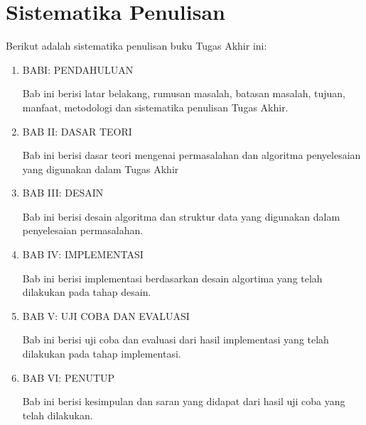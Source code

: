 	\section{Sistematika Penulisan}
	Berikut adalah sistematika penulisan buku Tugas Akhir ini:
	\begin{enumerate}
		\item BABI: PENDAHULUAN
		
		Bab ini berisi latar belakang, rumusan masalah, batasan masalah, tujuan, manfaat, metodologi dan sistematika penulisan Tugas Akhir.
		
		\item BAB II: DASAR TEORI
		
		Bab ini berisi dasar teori mengenai permasalahan dan algoritma penyelesaian yang digunakan dalam Tugas Akhir
		
		\item BAB III: DESAIN
		
		Bab ini berisi desain algoritma dan struktur data yang digunakan dalam penyelesaian permasalahan.
		
		\item BAB IV: IMPLEMENTASI
		
		Bab ini berisi implementasi berdasarkan desain algortima yang telah dilakukan pada tahap desain.
		
		\item BAB V: UJI COBA DAN EVALUASI
		
		Bab ini berisi uji coba dan evaluasi dari hasil implementasi yang telah dilakukan pada tahap implementasi.
		
		\item BAB VI: PENUTUP
		
		Bab ini berisi kesimpulan dan saran yang didapat dari hasil uji coba yang telah dilakukan.
	\end{enumerate}

\cleardoublepage

